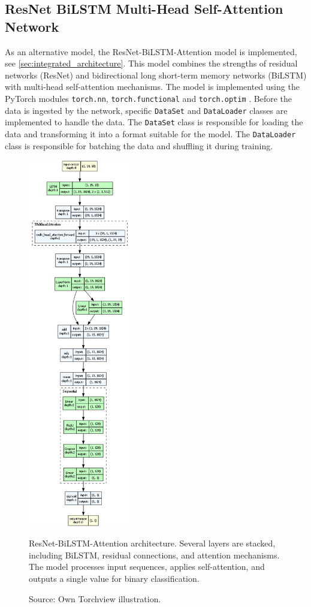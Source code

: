 \subsection{ResNet BiLSTM Multi-Head Self-Attention Network}
As an alternative model, the ResNet-BiLSTM-Attention model is implemented, see \autoref{sec:integrated_architecture}. This model combines the strengths of residual networks (ResNet) and bidirectional long short-term memory networks (BiLSTM) with multi-head self-attention mechanisms. The model is implemented using the PyTorch modules \texttt{torch.nn}, \texttt{torch.functional} and \texttt{torch.optim} \autocite{PyTorch}. Before the data is ingested by the network, specific \texttt{DataSet} and \texttt{DataLoader} classes are implemented to handle the data. The \texttt{DataSet} class is responsible for loading the data and transforming it into a format suitable for the model. The \texttt{DataLoader} class is responsible for batching the data and shuffling it during training.

\begin{figure}[htbp]
  \centering
  \includegraphics[width=0.4\textwidth]{figures/architecture.png}
  \caption[ResNet-BiLSTM-Attention Architecture]{ResNet-BiLSTM-Attention architecture. Several layers are stacked, including BiLSTM, residual connections, and attention mechanisms. The model processes input sequences, applies self-attention, and outputs a single value for binary classification.}
  \label{fig:architecture}
  \caption*{Source: Own Torchview illustration.}
\end{figure}

